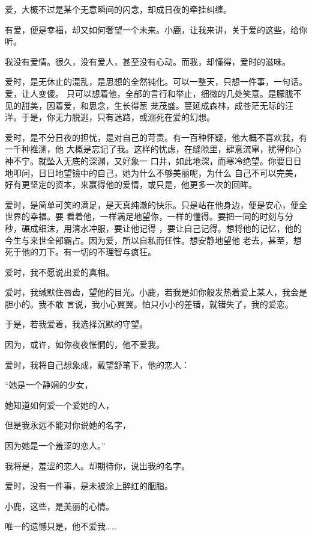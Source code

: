\documentclass[12pt,a4paper]{article}
\begin{document}
		爱，大概不过是某个无意瞬间的闪念，却成日夜的牵挂纠缠。

		有爱，便是幸福，却又如何奢望一个未来。小鹿，让我来讲，关于爱的这些，给你听。

		我没有爱情。很久，没有爱人，甚至没有心动。而我，却懂得，爱时的滋味。

		爱时，是无休止的混乱，是思想的全然钝化。可以一整天，只想一件事，一句话。爱，让人变傻。
	只可以想着他，全部的言行和举止，细微的几处笑意。是朦胧不见的甜美，因着爱，和思念，生长得葱
	茏茂盛。蔓延成森林，成苍茫无际的汪洋。于是，你无力脱逃，只有迷路，或溺死在爱的幻想。

		爱时，是不分日夜的担忧，是对自己的苛责。有一百种怀疑，他大概不喜欢我，有一千种推测，他
	大概是忘记了我。这样的忧虑，在缝隙里，肆意流窜，扰得你心神不宁。就坠入无底的深渊，又好象一
	口井，如此地深，而寒冷绝望。你要日日地叩问，日日地望镜中的自己，她为什么不够美丽呢，为什么
	自己不可以完美，好有更坚定的资本，来赢得他的爱情，或只是，他更多一次的回眸。

		爱时，是简单可笑的满足，是天真纯澈的快乐。只是站在他身边，便是安心，便全世界的幸福。要
	看着他，一样满足地望你，一样的懂得。要把一同的时刻与分秒，碾成细沫，用清水冲服，要让他记得
	，要让自己记得。想将他的记忆，他的今生与来世全部霸占。因为爱，所以自私而任性。想安静地望他
	老去，甚至，想死于他的刀下。有一切的不理智与疯狂。

		爱时，我不愿说出爱的真相。

		爱时，我缄默住唇齿，望他的目光。小鹿，若我是如你般发热着爱上某人，我会是胆小的。我不敢
	言说，我小心翼翼。怕只小小的差错，就错失了，我的爱恋。


		于是，若我爱着，我选择沉默的守望。\par
		因为，或许，如你夜夜怅惘的，他不爱我。\par
		爱时，我将自己想象成，戴望舒笔下，他的恋人：\par
		“她是一个静娴的少女，\par
		她知道如何爱一个爱她的人，\par
		但是我永远不能对你说她的名字，\par
		因为她是一个羞涩的恋人。”\par
		我将是，羞涩的恋人。却期待你，说出我的名字。\par
		爱时，没有一件事，是未被涂上醉红的胭脂。\par
		小鹿，这些，是美丽的心情。\par
		唯一的遗憾只是，他不爱我……

	\endwriting


\end{document}
